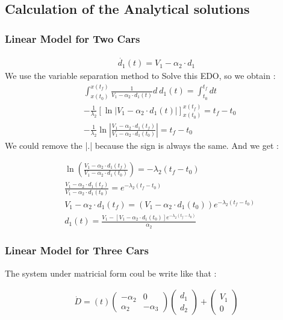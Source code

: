 \documentclass{article}
\begin{document}
	\subsection{Calculation of the Analytical solutions}
	
	\subsubsection{Linear Model for Two Cars}
	
	\label{eq:EDO1}
	\begin{align*} 
		\dot{d_1}(t) = V_1 - \alpha_2 \cdot d_1
	\end{align*}
	We use the variable separation method to Solve this EDO, so we obtain : 
	\begin{align*} 
		&\int_{x(t_0)}^{x(t_f)} \frac{1}{V_1 - \alpha_2 \cdot d_1(t)} d \ d_1(t) = \int_{t_0}^{t_f} dt \\
		&-\frac{1}{\lambda_2} \left[ \ln\left| V_1 - \alpha_2 \cdot d_1(t) \right| \right]_{x(t_0)}^{x(t_f)} = t_f-t_0 \\
		&-\frac{1}{\lambda_2} \ln\left| \frac{V_1 - \alpha_2 \cdot d_1(t_f)}{V_1 - \alpha_2 \cdot d_1(t_0)} \right| = t_f-t_0
	\end{align*}
	We could remove the |.| because the sign is always the same. And we get : 
	
	\begin{align*}
		&\ln\left( \frac{V_1 - \alpha_2 \cdot d_1(t_f)}{V_1 - \alpha_2 \cdot d_1(t_0)} \right)  = -\lambda_2( t_f-t_0)\\
		&\frac{V_1 - \alpha_2 \cdot d_1(t_f)}{V_1 - \alpha_2 \cdot d_1(t_0)}  = e^{-\lambda_2( t_f-t_0)} \\
		&V_1 - \alpha_2 \cdot d_1(t_f)   = (V_1 - \alpha_2 \cdot d_1(t_0))e^{-\lambda_2( t_f-t_0)} \\
		&\boxed{
			d_1(t) = \frac{V_1 - [V_1 - \alpha_2 \cdot d_1(t_0)]e^{-\lambda_2( t_f-t_0)}}{\alpha_2}
		}
	\end{align*}

	\subsubsection{Linear Model for Three Cars}
	\label{eq:EDO2}
	The system under matricial form coul be write like that :
	
	\begin{align*}
		\dot{D}=(t)\begin{pmatrix}
			-\alpha_2 & 0 \\
			\alpha_2 & -\alpha_3
		\end{pmatrix}
		\begin{pmatrix}
			d_1 \\
			d_2
		\end{pmatrix} + 
		\begin{pmatrix}
			V_1 \\
			0
		\end{pmatrix}
	\end{align*}
	
\end{document}
